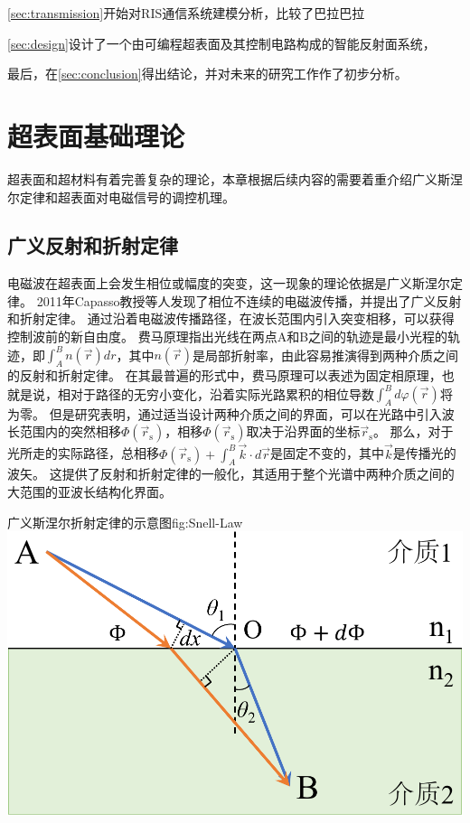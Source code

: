\documentclass[supercite]{HustGraduPaper}
\begin{document}
\autoref{sec:transmission}开始对RIS通信系统建模分析，比较了巴拉巴拉

\autoref{sec:design}设计了一个由可编程超表面及其控制电路构成的智能反射面系统，

最后，在\autoref{sec:conclusion}得出结论，并对未来的研究工作作了初步分析。

\section{超表面基础理论}\label{sec:theory}

超表面和超材料有着完善复杂的理论，本章根据后续内容的需要着重介绍广义斯涅尔定律和超表面对电磁信号的调控机理。

\subsection{广义反射和折射定律}\label{subsec:snell-law}

电磁波在超表面上会发生相位或幅度的突变，这一现象的理论依据是广义斯涅尔定律\cite{9326394}。
2011年Capasso教授等人发现了相位不连续的电磁波传播，并提出了广义反射和折射定律\cite{yu2011light}。
通过沿着电磁波传播路径，在波长范围内引入突变相移，可以获得控制波前的新自由度。
费马原理指出光线在两点A和B之间的轨迹是最小光程的轨迹，即$ \int_{A}^{B} n(\vec{r}) dr $，其中$ n(\vec{r}) $是局部折射率，由此容易推演得到两种介质之间的反射和折射定律。
在其最普遍的形式中，费马原理可以表述为固定相原理\cite{feynman2010quantum}，也就是说，相对于路径的无穷小变化，沿着实际光路累积的相位导数$ \int_{A}^{B} d \varphi (\vec{r}) $将为零。
但是研究表明，通过适当设计两种介质之间的界面，可以在光路中引入波长范围内的突然相移$ \Phi (\vec{r}_\mathrm{s}) $，相移$ \Phi (\vec{r}_\mathrm{s}) $取决于沿界面的坐标$ \vec{r}_\mathrm{s} $。
那么，对于光所走的实际路径，总相移$ \Phi\left(\vec{r}_{\mathrm{s}}\right)+\int_{A}^{B} \vec{k} \cdot d \vec{r} $是固定不变的，其中$ \vec{k} $是传播光的波矢。
这提供了反射和折射定律的一般化，其适用于整个光谱中两种介质之间的大范围的亚波长结构化界面。

\begin{generalfig}[htb]{广义斯涅尔折射定律的示意图}{fig:Snell-Law}
	\includegraphics[width=0.5\linewidth]{Figures/Snell-Law.pdf}
\end{generalfig}
\end{document}
